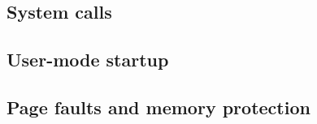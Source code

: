 \documentclass{article}
\begin{document}
\begin{CJK*}{UTF8}{gkai}
\subsection{System calls}

\subsection{User-mode startup}

\subsection{Page faults and memory protection}




\begin{lstlisting}[style=console]
\end{lstlisting}

\begin{lstlisting}[style=console]
\end{lstlisting}

\begin{lstlisting}[style=console]
\end{lstlisting}







\begin{lstlisting}[style=ccode, title={\scriptsize \ttfamily \bfseries kern/env.c: env\_create()}]
\end{lstlisting}

\begin{lstlisting}[style=ccode, title={\scriptsize \ttfamily \bfseries kern/env.c: env\_create()}]
\end{lstlisting}

\begin{lstlisting}[style=ccode, title={\scriptsize \ttfamily \bfseries kern/env.c: env\_create()}]
\end{lstlisting}









\begin{lstlisting}[style=exercise]
\end{lstlisting}

\begin{lstlisting}[style=exercise]
\end{lstlisting}






\end{CJK*}
\end{document}
